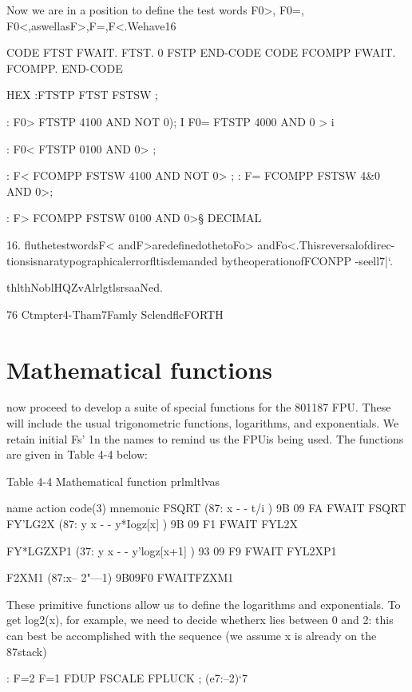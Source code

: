 {{{{Now we are in a position to define the test words F0>, F0=,
F0<,aswellasF>,F=,F<.Wehave16

CODE FTST FWAIT. FTST. 0 FSTP END-CODE
CODE FCOMPP FWAIT. FCOMPP. END-CODE

HEX
:FTSTP FTST FSTSW ;

: F0> FTSTP 4100 AND NOT 0);
I F0= FTSTP 4000 AND 0 > i

: F0< FTSTP 0100 AND 0> ;

: F< FCOMPP FSTSW 4100 AND NOT 0> ;
: F= FCOMPP FSTSW 4&0 AND 0>;

: F> FCOMPP FSTSW 0100 AND 0>§
DECIMAL

 



16. fluthetestwordsF< andF>aredefinedothetoFo> andFo<.Thisreversalofdirec-
tionsisnaratypographicalerrorfltisdemanded bytheoperationofFCONPP -seell7|‘.

thlthNoblHQZvAlrlgtlsrsaaNed.

76 Ctmpter4-Tham7Famly SclendflcFORTH

\section{Mathematical functions}

 now proceed to develop a suite of special functions for the 801187 FPU. These will include the usual trigonometric functions, logarithms, and exponentials. We retain initial Fs' 1n the names to remind us the FPUis being used. The functions are given in Table 4-4 below:

Table 4-4 Mathematical function prlmltlvas

 

name action code(3) mnemonic
FSQRT (87: x - - t/i ) 9B 09 FA FWAIT FSQRT
FY'LG2X (87: y x - - y*Iogz[x] ) 9B 09 F1 FWAIT FYL2X

FY*LGZXP1 (37: y x - - y'logz[x+1] ) 93 09 F9 FWAIT FYL2XP1

F2XM1 (87:x-- 2"—1) 9B09F0 FWAITFZXM1

 

 

 

These primitive functions allow us to define the logarithms and
exponentials. To get log2(x), for example, we need to decide
whetherx lies between 0 and 2: this can best be accomplished with
the sequence (we assume x is already on the 87stack)

: F=2 F=1 FDUP FSCALE FPLUCK ; (e7:--2)‘7

}}}}
